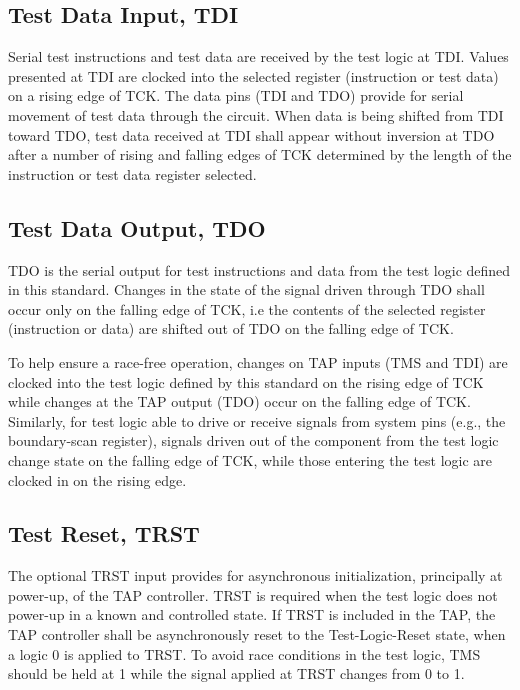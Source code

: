 \subsection{Test Data Input, TDI}
\label{subsec:tdi}
Serial test instructions and test data are received by the test logic at TDI. Values presented at TDI are clocked into the selected register (instruction or test data) on a rising edge of TCK.
The data pins (TDI and TDO) provide for serial movement of test data through the circuit. When data is being shifted from TDI toward TDO, test data received at TDI shall appear without inversion at TDO after a number of rising and falling edges of TCK determined by the length of the instruction or test data register selected.

\subsection{Test Data Output, TDO}
\label{subsec:tdo}
TDO is the serial output for test instructions and data from the test logic defined in this standard. Changes in the state of the signal driven through TDO shall occur only on the falling edge of TCK, i.e the contents of the selected register (instruction or data) are shifted out of TDO on the falling edge of TCK.

To help ensure a race-free operation, changes on TAP inputs (TMS and TDI) are clocked into the test logic defined by this standard on the rising edge of TCK while changes at the TAP output (TDO) occur on the falling edge of TCK. Similarly, for test logic able to drive or receive signals from system pins (e.g., the boundary-scan register), signals driven out of the component from the test logic change state on the falling edge of TCK, while those entering the test logic are clocked in on the rising edge. 

\subsection{Test Reset, TRST}
\label{subsec:trst}
The optional TRST input provides for asynchronous initialization, principally at power-up, of the TAP controller. TRST is required when the test logic does not power-up in a known and controlled state. If TRST is included in the TAP, the TAP controller shall be asynchronously reset to the Test-Logic-Reset state, when a logic 0 is applied to TRST. To avoid race conditions in the test logic, TMS should be held at 1 while the signal applied at TRST changes from 0 to 1.

